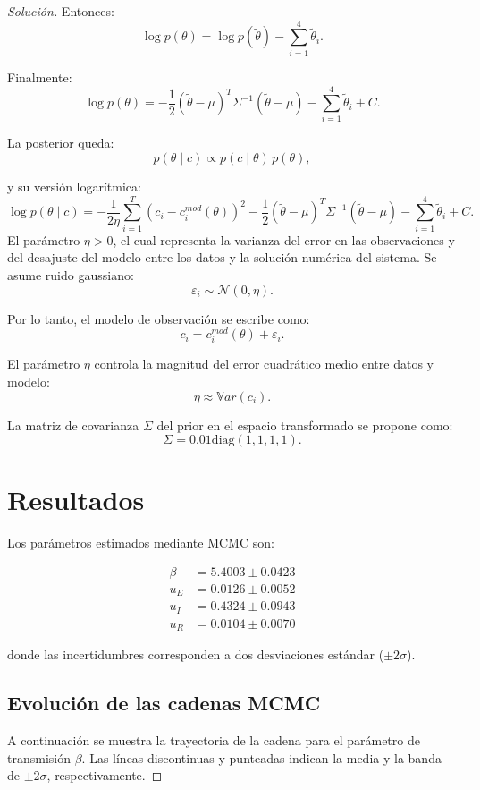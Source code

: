 \documentclass[12pt,spanish,mexico]{article}
\numberwithin{equation}{section}
\theoremstyle{definition}
\theoremstyle{remark}
\newenvironment{solution}{\begin{proof}[Solución]}{\end{proof}}
\begin{document}
\begin{solution}
Entonces:
\[
\log p(\theta)
=
\log p(\tilde{\theta})
-
\sum_{i=1}^4 \tilde{\theta}_i.
\]

Finalmente:
\[
\log p(\theta)
=
-\frac{1}{2}(\tilde{\theta}-\mu)^T \Sigma^{-1} (\tilde{\theta}-\mu)
-\sum_{i=1}^4 \tilde{\theta}_i + C.
\]

La posterior queda:
\[
p(\theta \mid c) \propto p(c \mid \theta)\, p(\theta),
\]

y su versión logarítmica:
\[
\log p(\theta \mid c)
=
-\frac{1}{2\eta}\sum_{i=1}^T (c_i - c_i^{mod}(\theta))^2
-\frac{1}{2}(\tilde{\theta}-\mu)^T \Sigma^{-1} (\tilde{\theta}-\mu)
-\sum_{i=1}^4 \tilde{\theta}_i + C.
\]
El parámetro \(\eta > 0\), el cual representa la varianza del error en las observaciones y del desajuste del modelo entre los datos y la solución numérica del sistema. Se asume ruido gaussiano:
\[
\varepsilon_i \sim \mathcal{N}(0,\eta).
\]

Por lo tanto, el modelo de observación se escribe como:
\[
c_i = c_i^{mod}(\theta) + \varepsilon_i.
\]

El parámetro \(\eta\) controla la magnitud del error cuadrático medio entre datos y modelo:
\[
\eta \approx \mathbb{V}ar(c_i).
\]

La matriz de covarianza \(\Sigma\) del prior en el espacio transformado se propone como:
\[
\Sigma =0.01 \mathrm{diag}\left(1,1,1,1\right).
\]
\section{Resultados}

Los parámetros estimados mediante MCMC son:

\[
\begin{aligned}
\beta &= 5.4003 \pm 0.0423 \\
u_E &= 0.0126 \pm 0.0052 \\
u_I &= 0.4324 \pm 0.0943 \\
u_R &= 0.0104 \pm 0.0070
\end{aligned}
\]

donde las incertidumbres corresponden a dos desviaciones estándar (\( \pm 2\sigma \)).

\subsection{Evolución de las cadenas MCMC}

A continuación se muestra la trayectoria de la cadena para el parámetro de transmisión \( \beta \). Las líneas discontinuas y punteadas indican la media y la banda de \( \pm 2\sigma \), respectivamente.


\end{solution}
\end{document}
